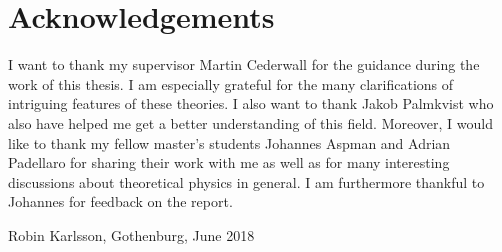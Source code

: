 \thispagestyle{plain}			%
\section*{Acknowledgements}
I want to thank my supervisor Martin Cederwall for the guidance during the work of this thesis. I am especially grateful for the many clarifications of intriguing features of these theories. I also want to thank Jakob Palmkvist who also have helped me get a better understanding of this field. Moreover, I would like to thank my fellow master's students Johannes Aspman and Adrian Padellaro for sharing their work with me as well as for many interesting discussions about theoretical physics in general. I am furthermore thankful to Johannes for feedback on the report.  

\vspace{1.5cm}
\hfill
Robin Karlsson, Gothenburg, June 2018

\newpage				%
\thispagestyle{empty}
\mbox{}